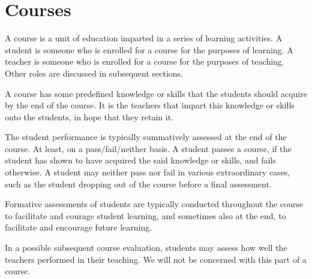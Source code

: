 
\section{Courses}

A course is a unit of education imparted in a series of learning activities. A
student is someone who is enrolled for a course for the purposes of learning.
A teacher is someone who is enrolled for a course for the purposes of teaching.
Other roles are discussed in subsequent sections.

A course has some predefined knowledge or skills that the students should
acquire by the end of the course. It is the teachers that impart this knowledge
or skills onto the students, in hope that they retain it.

The student performance is typically summatively assessed at the end of the
course. At least, on a pass/fail/neither basis. A student passes a course, if
the student has shown to have acquired the said knowledge or skills, and fails
otherwise.  A student may neither pass nor fail in various extraordinary cases,
such as the student dropping out of the course before a final assessment.

Formative assessments of students are typically conducted throughout the course
to facilitate and courage student learning, and sometimes also at the end, to
facilitate and encourage future learning.

In a possible subsequent course evaluation, students may assess how well the
teachers performed in their teaching. We will not be concerned with this part
of a course.
